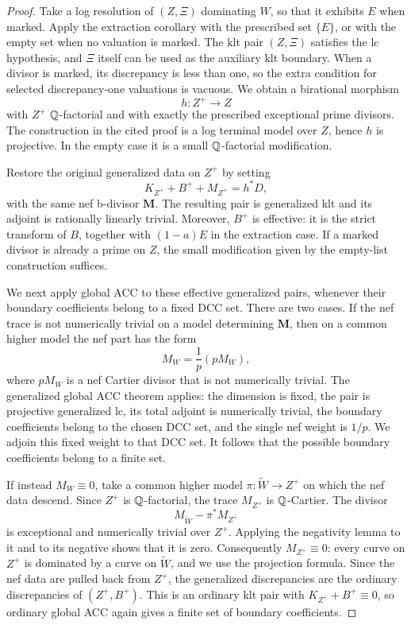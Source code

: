\begin{proof}
Take a log resolution of $(Z,\Xi)$ dominating $W$, so that it exhibits
$E$ when marked.  Apply the extraction corollary
\cite[Corollary~1.4.3 and its proof]{BCHM2010} with the prescribed set
$\{E\}$, or with the empty set when no valuation is marked.  The klt pair
$(Z,\Xi)$ satisfies the lc hypothesis, and $\Xi$ itself can be used as the
auxiliary klt boundary.  When a divisor is marked, its discrepancy is less
than one, so the extra condition for selected discrepancy-one valuations is
vacuous.  We obtain
a birational morphism
\[
 h:Z^+\longrightarrow Z
\]
with $Z^+$ $\mathbb Q$-factorial and with exactly the prescribed exceptional prime
divisors.  The construction in the cited proof is a log terminal model over
$Z$, hence $h$ is projective.  In the empty case it is a small
$\mathbb Q$-factorial modification.

Restore the original generalized data on $Z^+$ by setting
\[
 K_{Z^+}+B^++M_{Z^+}=h^*D,
\]
with the same nef b-divisor $\mathbf M$.  The resulting pair is generalized
klt and its adjoint is rationally linearly trivial.  Moreover, $B^+$ is
effective: it is the strict transform of $B$, together with $(1-a)E$ in
the extraction case.  If a marked divisor is already a prime on $Z$, the
small modification given by the empty-list construction suffices.

We next apply global ACC to these effective generalized pairs, whenever
their boundary coefficients belong to a fixed DCC set.  There are two
cases.  If the nef trace is not numerically trivial on a model determining
$\mathbf M$, then on a common higher model the nef part has the form
\[
 M_W=\frac1p(pM_W),
\]
where $pM_W$ is a nef Cartier divisor that is not numerically trivial.
The generalized global ACC theorem
\cite[Theorem~1.6]{BirkarZhang2016} applies: the dimension is fixed, the
pair is projective generalized lc, its total adjoint is numerically
trivial, the boundary coefficients belong to the chosen DCC set, and the
single nef weight is $1/p$.  We adjoin this fixed weight to that DCC set.
It follows that the possible boundary coefficients belong to a finite
set.

If instead $M_W\equiv0$, take a common higher model
$\pi:\widetilde W\to Z^+$ on which the nef data descend.  Since $Z^+$ is
$\mathbb Q$-factorial, the trace $M_{Z^+}$ is $\mathbb Q$-Cartier.  The divisor
\[
 M_{\widetilde W}-\pi^*M_{Z^+}
\]
is exceptional and numerically trivial over $Z^+$.  Applying the
negativity lemma to it and to its negative shows that it is zero.
Consequently $M_{Z^+}\equiv0$: every curve on $Z^+$ is dominated by a curve
on $\widetilde W$, and we use the projection formula.  Since the nef data
are pulled back from $Z^+$, the generalized discrepancies are the ordinary
discrepancies of $(Z^+,B^+)$.  This is an ordinary klt pair with
$K_{Z^+}+B^+\equiv0$, so ordinary global ACC
\cite[Theorem~1.5]{HMX2014} again gives a finite set of boundary
coefficients.


\end{proof}
